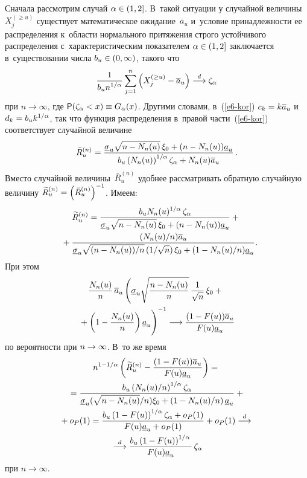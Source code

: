 \begin{multicols}{2}
Сначала рассмотрим случай $\alpha\hm\in(1,2]$. 
В~такой ситуации у случайной величины~$X_j^{(\ge u)}$ существует 
математическое ожидание~$\overline{a}_u$ и~условие принадлежности ее 
распределения к~области нормального притяжения строго устойчивого
 распределения с~характеристическим показателем $\alpha\hm\in(1,2]$ 
 заключается в~существовании числа $b_u\hm\in(0,\infty)$, такого что
$$
\displaystyle\frac{\displaystyle 1\mathstrut}{\displaystyle b_un^{1/\alpha}\mathstrut}\sum\limits_{j=1}^n\left(X_j^{(\ge u)}-
\overline{a}_u\right)\stackrel{d}{\longrightarrow} \zeta_{\alpha}
$$
при $n\to\infty$, где ${\sf P}(\zeta_{\alpha}\hm<x)\hm\equiv G_{\alpha}(x)$. 
Другими словами, в~(\ref{e6-kor}) $c_k\hm=k \overline{a}_u$ 
и~$d_k\hm=b_uk^{1/\alpha}$, так что функция распределения в~правой части~(\ref{e6-kor}) 
 соответствует случайной величине
$$
\bar{R}_u^{(n)}=\displaystyle\frac{\displaystyle \underline{\sigma}_u\sqrt{n-N_n(u)}\,\xi_0+
(n-N_n(u))\underline{a}_u\mathstrut}{\displaystyle b_u\left(N_n(u)\right)^{1/\alpha}
\zeta_{\alpha}+
N_n(u)\overline{a}_u\mathstrut}\,.
$$
Вместо случайной величины~$\bar{R}_u^{(n)}$ удобнее рассматривать 
обратную  случайную величину $\widetilde{R}_u^{(n)}
\hm=\left(\bar{R}_u^{(n)}\right)^{-1}$. Имеем:
\begin{multline*}
\widetilde{R}_u^{(n)}=\displaystyle\frac{\displaystyle b_uN_n(u)^{1/\alpha}\,\zeta_{\alpha}\mathstrut}{\displaystyle \underline{\sigma}_u\sqrt{n-N_n(u)}\,\xi_0+(n-N_n(u))\underline{a}_u\mathstrut}+{}\\
{}+
\displaystyle\frac{\displaystyle ({N_n(u)}/{n})\overline{a}_u\mathstrut}{\displaystyle \underline{\sigma}_u\sqrt{({n-N_n(u)})/{n}}\,
({1}/{\sqrt{n}})\,\xi_0+
(1-{N_n(u)}/{n})\underline{a}_u\mathstrut}.\hspace*{-7.1pt}
\end{multline*}
При этом
\begin{multline*}
\fr{N_n(u)}{n}\,\overline{a}_u
\left(
\underline{\sigma}_u\sqrt{\fr{n-N_n(u)}{n}}\,
\fr{1}{\sqrt{n}}\,\xi_0+{}\right.\\
\left.\vphantom{\sqrt{\fr{n-N_n(u)}{n}}}{}+ 
\left(1-\fr{N_n(u)}{n}\right)\underline{a}_u\right)^{-1}
\longrightarrow
\fr{(1-F(u))\overline{a}_u}{F(u)\underline{a}_u}
\end{multline*}
по вероятности при $n\hm\to\infty$. В~то же время
\begin{multline*}
n^{1-1/\alpha}\left(\widetilde{R}_u^{(n)}-\displaystyle\frac{\displaystyle (1-F(u))\overline{a}_u\mathstrut}{\displaystyle F(u)\underline{a}_u\mathstrut}\right)={}\\
{}=
\displaystyle\frac{\displaystyle b_u\left({N_n(u)}/{n}\right)^{1/\alpha}\zeta_{\alpha}\mathstrut}{\displaystyle \underline{\sigma}_u ({\sqrt{n-N_n(u)}}/{n})\xi_0+
\left(1-{N_n(u)}/{n}\right)\underline{a}_u\mathstrut}+{}\\
{}+o_P(1)={} \displaystyle\frac{\displaystyle b_u\left(1-F(u)\right)^{1/\alpha}\zeta_{\alpha}+o_P(1)\mathstrut}{\displaystyle F(u)\underline{a}_u+o_P(1)\mathstrut}+o_P(1)\stackrel{d}{\longrightarrow}{}\\
{}\stackrel{d}{\longrightarrow}
\displaystyle\frac{\displaystyle b_u\left(1-F(u)\right)^{1/\alpha}\mathstrut}{\displaystyle F(u)
\underline{a}_u\mathstrut}\,\zeta_{\alpha}
\end{multline*}
при $n\to\infty$.


\end{multicols}
